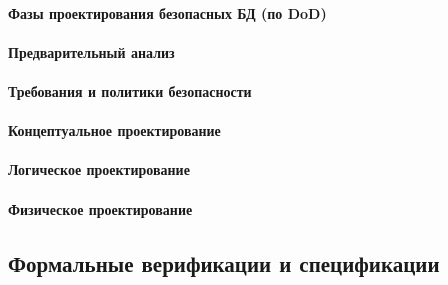 \paragraph{Фазы проектирования безопасных БД (по DoD)}
\paragraph{Предварительный анализ}
\paragraph{Требования и политики  безопасности}
\paragraph{Концептуальное проектирование}
\paragraph{Логическое  проектирование}
\paragraph{Физическое проектирование}

\subsection{Формальные верификации и спецификации}
